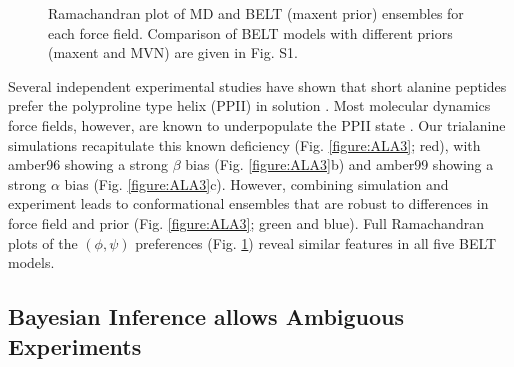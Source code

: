 \documentclass[journal=jacsat,manuscript=article]{achemso}
\begin{document}
\begin{figure}

\caption{
Ramachandran plot of MD and BELT (maxent prior) ensembles for each force field.  Comparison of BELT models with different priors (maxent and MVN) are given in Fig. S1.  
}
\label{figure:Rama}
\end{figure}

Several independent experimental studies have shown that short alanine peptides prefer the polyproline type helix (PPII) in solution \cite{Grdadolnik2011, Graf2007, Avbelj2006}.  Most molecular dynamics force fields, however, are known to underpopulate the PPII state \cite{Graf2007,beauchamp2012protein,Nerenberg2011, Best2008}.  Our trialanine simulations recapitulate this known deficiency (Fig. \ref{figure:ALA3}; red), with amber96 showing a strong $\beta$ bias (Fig. \ref{figure:ALA3}b) and amber99 showing a strong $\alpha$ bias (Fig. \ref{figure:ALA3}c).  However, combining simulation and experiment leads to conformational ensembles that are robust to differences in force field and prior (Fig. \ref{figure:ALA3}; green and blue).  Full Ramachandran plots of the $(\phi, \psi)$ preferences (Fig. \ref{figure:Rama}) reveal similar features in all five BELT models.  

\subsection{Bayesian Inference allows Ambiguous Experiments}
\end{document}
